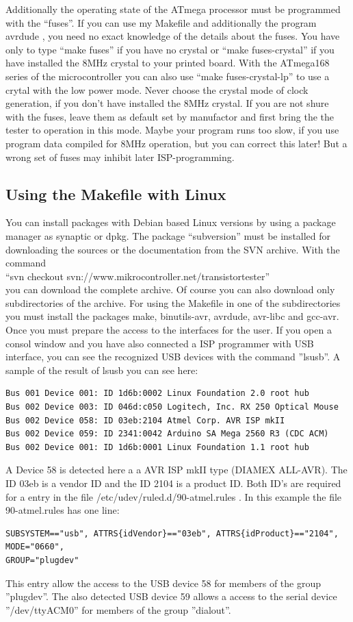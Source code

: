 Additionally the operating state of the
ATmega processor must be programmed with the ``fuses''.
If you can use my Makefile and additionally the program avrdude \cite{avrdude}, you need no exact
knowledge of the details about the fuses. You have only to type ``make fuses'' if you
have no crystal or ``make fuses-crystal'' if you have installed the 8MHz crystal to your printed board.
With the ATmega168 series of the microcontroller you can also use ``make fuses-crystal-lp'' to use
a crytal with the low power mode.
Never choose the crystal mode of clock generation, if you don't have installed
the 8MHz crystal. If you are not shure with the fuses, leave them as default
set by manufactor and first bring the the tester to operation in this mode.
Maybe your program runs too slow, if you use program data compiled for
8MHz operation, but you can correct this later! But a wrong set of fuses may inhibit
later ISP-programming.

\subsection{Using the Makefile with Linux}
You can install packages with Debian based Linux versions by using a package manager as synaptic or dpkg.
The package ``subversion'' must be installed for downloading the sources or the documentation from the SVN archive.
With the command \\
``svn checkout svn://www.mikrocontroller.net/transistortester'' \\
you can download the complete archive.
Of course you can also download only subdirectories of the archive.
For using the Makefile in one of the subdirectories you must install the packages
make, binutils-avr, avrdude, avr-libc and gcc-avr.
Once you must prepare the access to the interfaces for the user.
If you open a consol window and you have also connected a ISP programmer with USB interface,
you can see the recognized USB devices with the command ''lsusb''.
A sample of the result of lsusb you can see here:
\begin{verbatim}
Bus 001 Device 001: ID 1d6b:0002 Linux Foundation 2.0 root hub
Bus 002 Device 003: ID 046d:c050 Logitech, Inc. RX 250 Optical Mouse
Bus 002 Device 058: ID 03eb:2104 Atmel Corp. AVR ISP mkII
Bus 002 Device 059: ID 2341:0042 Arduino SA Mega 2560 R3 (CDC ACM)
Bus 002 Device 001: ID 1d6b:0001 Linux Foundation 1.1 root hub
\end{verbatim}
A Device 58 is detected here a a AVR ISP mkII type (DIAMEX ALL-AVR).
The ID 03eb is a vendor ID and the ID 2104 is a product ID.
Both ID's are required for a entry in the file /etc/udev/ruled.d/90-atmel.rules .
In this example the file 90-atmel.rules has one line:
\begin{verbatim}
SUBSYSTEM=="usb", ATTRS{idVendor}=="03eb", ATTRS{idProduct}=="2104", MODE="0660",
GROUP="plugdev"
\end{verbatim}
This entry allow the access to the USB device 58 for members of the group ''plugdev''.
The also detected USB device 59 allows a access to the serial device ''/dev/ttyACM0'' for
members of the group ''dialout''.

